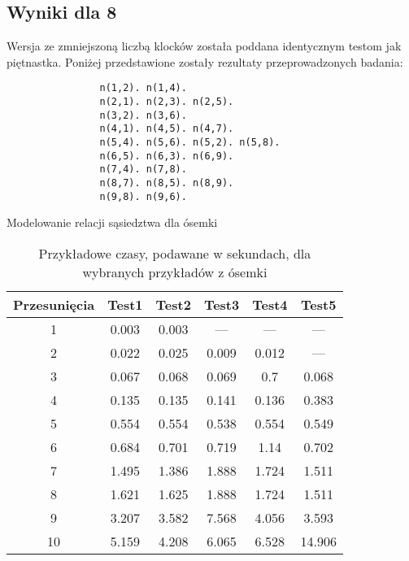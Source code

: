     \subsection{Wyniki dla 8}
        Wersja ze zmniejszoną liczbą klocków została poddana identycznym testom jak piętnastka. Poniżej przedstawione zostały rezultaty 
        przeprowadzonych badania:
        \begin{listing}[H]
            \begin{verbatim}
                n(1,2). n(1,4).
                n(2,1). n(2,3). n(2,5).
                n(3,2). n(3,6).
                n(4,1). n(4,5). n(4,7).
                n(5,4). n(5,6). n(5,2). n(5,8).
                n(6,5). n(6,3). n(6,9).
                n(7,4). n(7,8).
                n(8,7). n(8,5). n(8,9).
                n(9,8). n(9,6).
            \end{verbatim}
        \caption{Modelowanie relacji sąsiedztwa dla ósemki}
        \end{listing}
        \begin{table}[H]
            \centering
             \begin{tabular}{||c | c | c | c | c | c |} 
             \hline
             Przesunięcia & Test1 & Test2 & Test3 & Test4 & Test5 \\ [0.5ex] 
             \hline\hline
             1 & 0.003 & 0.003 & --- & --- & --- \\ 
             \hline
             2 & 0.022 & 0.025 & 0.009 & 0.012 & ---   \\
             \hline
             3 & 0.067 & 0.068 & 0.069 & 0.7 & 0.068  \\
             \hline
             4 & 0.135 & 0.135 & 0.141 & 0.136 & 0.383 \\
             \hline
             5 & 0.554 & 0.554 & 0.538 & 0.554 & 0.549 \\
             \hline
             6 & 0.684 & 0.701 & 0.719 & 1.14 & 0.702 \\ 
             \hline
             7 & 1.495 & 1.386 & 1.888 & 1.724 & 1.511  \\
             \hline
             8 & 1.621 & 1.625 & 1.888 & 1.724 & 1.511  \\
             \hline
             9 & 3.207 & 3.582 & 7.568 & 4.056 & 3.593  \\
             \hline
             10 & 5.159 & 4.208 & 6.065 & 6.528 & 14.906  \\ [1ex]
             \hline
             \end{tabular}
             \caption{Przykładowe czasy, podawane w sekundach, dla wybranych przykładów z ósemki}
        \end{table}
    
